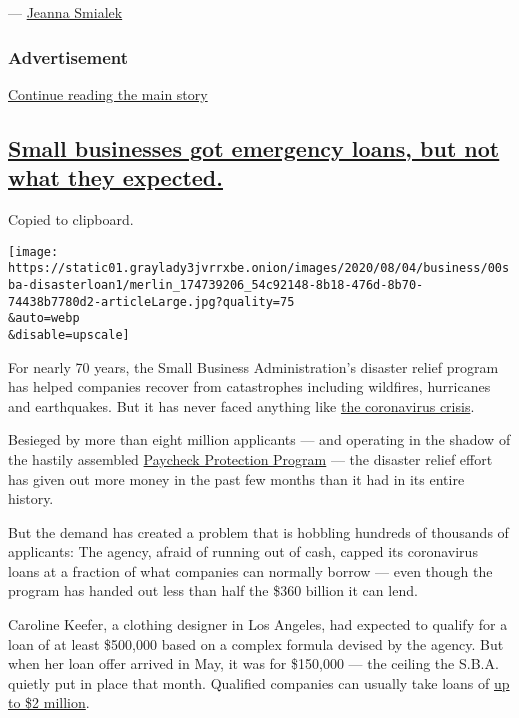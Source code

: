 --- \href{https://www.nytimes3xbfgragh.onion/by/jeanna-smialek}{Jeanna
Smialek}

\hypertarget{advertisement}{%
\subsubsection{Advertisement}\label{advertisement}}

\protect\hyperlink{after-dfp-ad-mid1}{Continue reading the main story}

\hypertarget{small-businesses-got-emergency-loans-but-not-what-they-expected}{%
\subsection{\texorpdfstring{\protect\hyperlink{small-businesses-got-emergency-loans-but-not-what-they-expected}{Small
businesses got emergency loans, but not what they
expected.}}{Small businesses got emergency loans, but not what they expected.}}\label{small-businesses-got-emergency-loans-but-not-what-they-expected}}

Copied to clipboard.

\texttt{[image: https://static01.graylady3jvrrxbe.onion/images/2020/08/04/business/00sba-disasterloan1/merlin\_174739206\_54c92148-8b18-476d-8b70-74438b7780d2-articleLarge.jpg?quality=75\\\&auto=webp\\\&disable=upscale]}

For nearly 70 years, the Small Business Administration's disaster relief
program has helped companies recover from catastrophes including
wildfires, hurricanes and earthquakes. But it has never faced anything
like
\href{https://www.nytimes3xbfgragh.onion/news-event/coronavirus}{the
coronavirus crisis}.

Besieged by more than eight million applicants --- and operating in the
shadow of the hastily assembled
\href{https://www.nytimes3xbfgragh.onion/2020/04/26/business/ppp-small-business-loans.html}{Paycheck
Protection Program} --- the disaster relief effort has given out more
money in the past few months than it had in its entire history.

But the demand has created a problem that is hobbling hundreds of
thousands of applicants: The agency, afraid of running out of cash,
capped its coronavirus loans at a fraction of what companies can
normally borrow --- even though the program has handed out less than
half the \$360 billion it can lend.

Caroline Keefer, a clothing designer in Los Angeles, had expected to
qualify for a loan of at least \$500,000 based on a complex formula
devised by the agency. But when her loan offer arrived in May, it was
for \$150,000 --- the ceiling the S.B.A. quietly put in place that
month. Qualified companies can usually take loans of
\href{https://www.sba.gov/about-sba/sba-newsroom/press-releases-media-advisories/sba-provide-disaster-assistance-loans-small-businesses-impacted-coronavirus-covid-19}{up
to \$2 million}.

